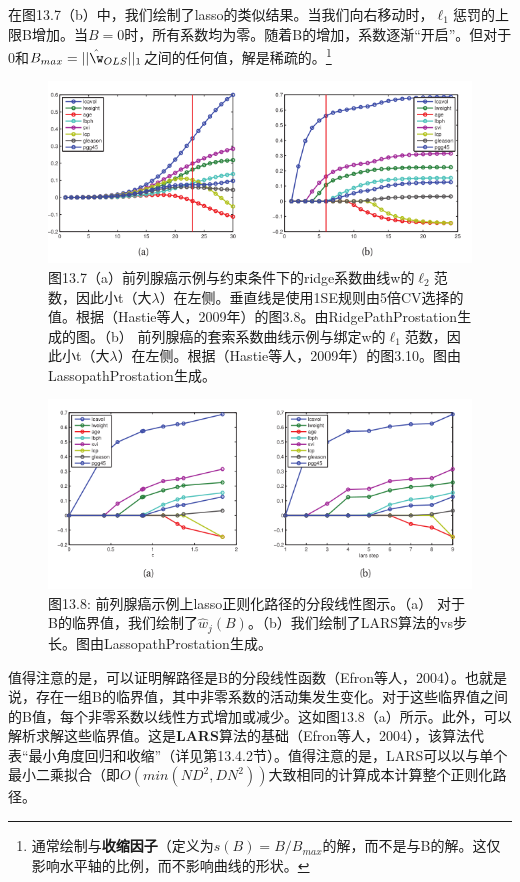 \documentclass[a4paper]{article}
\begin{document}
在图13.7（b）中，我们绘制了lasso的类似结果。当我们向右移动时，$\ell_1$惩罚的上限B增加。当$B=0$时，所有系数均为零。随着B的增加，系数逐渐“开启”。但对于0和$B_{max}=||\hat{\w}_{OLS}||_1$之间的任何值，解是稀疏的。\footnote{通常绘制与\textbf{收缩因子}（定义为$s(B)=B/B_{max}$的解，而不是与B的解。这仅影响水平轴的比例，而不影响曲线的形状。}

\begin{figure}[h]
	\centering
	\includegraphics[width=0.7\linewidth]{fig13/figure7}
	\caption*{图13.7（a）前列腺癌示例与约束条件下的ridge系数曲线w的$\ell_2$范数，因此小t（大$\lambda$）在左侧。垂直线是使用1SE规则由5倍CV选择的值。根据（Hastie等人，2009年）的图3.8。由RidgePathProstation生成的图。（b） 前列腺癌的套索系数曲线示例与绑定w的$\ell_1$范数，因此小t（大$\lambda$）在左侧。根据（Hastie等人，2009年）的图3.10。图由LassopathProstation生成。}
\end{figure}

\begin{figure}[h]
	\centering
	\includegraphics[width=0.7\linewidth]{fig13/figure8}
	\caption*{图13.8: 前列腺癌示例上lasso正则化路径的分段线性图示。（a） 对于B的临界值，我们绘制了$\hat{w}_j(B)$。（b）我们绘制了LARS算法的vs步长。图由LassopathProstation生成。}
\end{figure}

值得注意的是，可以证明解路径是B的分段线性函数（Efron等人，2004）。也就是说，存在一组B的临界值，其中非零系数的活动集发生变化。对于这些临界值之间的B值，每个非零系数以线性方式增加或减少。这如图13.8（a）所示。此外，可以解析求解这些临界值。这是\textbf{LARS}算法的基础（Efron等人，2004），该算法代表“最小角度回归和收缩”（详见第13.4.2节）。值得注意的是，LARS可以以与单个最小二乘拟合（即$O(min(ND^2,DN^2))$大致相同的计算成本计算整个正则化路径。
\end{document}
